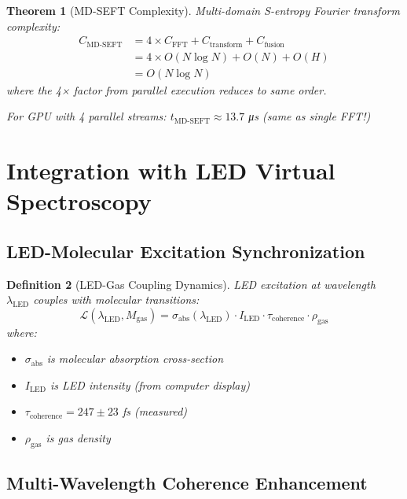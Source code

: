 \documentclass[12pt,a4paper]{article}
\newtheorem{theorem}{Theorem}[section]
\newtheorem{definition}[theorem]{Definition}
\begin{document}
\begin{theorem}[MD-SEFT Complexity]
Multi-domain S-entropy Fourier transform complexity:
\begin{align}
C_{\text{MD-SEFT}} &= 4 \times C_{\text{FFT}} + C_{\text{transform}} + C_{\text{fusion}} \\
&= 4 \times O(N \log N) + O(N) + O(H) \\
&= O(N \log N)
\end{align}
where the 4× factor from parallel execution reduces to same order.

For GPU with 4 parallel streams: $t_{\text{MD-SEFT}} \approx 13.7$ μs (same as single FFT!)
\end{theorem}

\section{Integration with LED Virtual Spectroscopy}

\subsection{LED-Molecular Excitation Synchronization}

\begin{definition}[LED-Gas Coupling Dynamics]
LED excitation at wavelength $\lambda_{\text{LED}}$ couples with molecular transitions:
\begin{equation}
\mathcal{L}(\lambda_{\text{LED}}, M_{\text{gas}}) = \sigma_{\text{abs}}(\lambda_{\text{LED}}) \cdot I_{\text{LED}} \cdot \tau_{\text{coherence}} \cdot \rho_{\text{gas}}
\end{equation}
where:
\begin{itemize}
\item $\sigma_{\text{abs}}$ is molecular absorption cross-section
\item $I_{\text{LED}}$ is LED intensity (from computer display)
\item $\tau_{\text{coherence}} = 247 \pm 23$ fs (measured)
\item $\rho_{\text{gas}}$ is gas density
\end{itemize}
\end{definition}

\subsection{Multi-Wavelength Coherence Enhancement}
\end{document}
